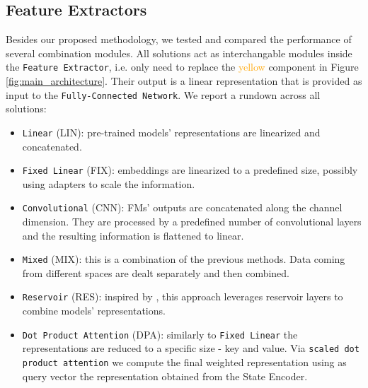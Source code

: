 \subsection{Feature Extractors}\label{sec:extractors}
Besides our proposed methodology, we tested and compared the performance of several combination modules. All solutions act as interchangable modules inside the \texttt{Feature Extractor}, i.e. only need to replace the \textcolor{orange}{yellow} component in Figure \ref{fig:main_architecture}. Their output is a linear representation that is provided as input to the \texttt{Fully-Connected Network}. We report a rundown across all solutions:
\begin{itemize}
    \item \texttt{Linear} (LIN): pre-trained models' representations are linearized and concatenated.
    \item \texttt{Fixed Linear} (FIX): embeddings are linearized to a predefined size, possibly using adapters to scale the information.
    \item \texttt{Convolutional} (CNN): FMs' outputs are concatenated along the channel dimension. They are processed by a predefined number of convolutional layers and the resulting information is flattened to linear.
    \item \texttt{Mixed} (MIX): this is a combination of the previous methods. Data coming from different spaces are dealt separately and then combined.
    \item \texttt{Reservoir} (RES): inspired by \citet{gallicchio2017}, this approach leverages reservoir layers to combine models' representations.
    \item \texttt{Dot Product Attention} (DPA): similarly to \texttt{Fixed Linear} the representations are reduced to a specific size - key and value. Via \texttt{scaled dot product attention} \citep{vaswani2017attention} we compute the final weighted representation using as query vector the representation obtained from the State Encoder.
\end{itemize}

